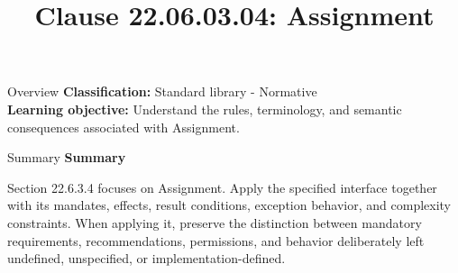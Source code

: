\documentclass[10pt,letterpaper]{article}
\title{Clause 22.06.03.04: Assignment}
\author{}
\date{}
\begin{document}
\maketitle
\begin{CornellOverviewBox}{Overview}
\textbf{Classification:} Standard library - Normative\\[2pt]
\textbf{Learning objective:} Understand the rules, terminology, and semantic consequences associated with Assignment.
\end{CornellOverviewBox}\begin{CornellSummaryBox}{Summary}
{\sffamily\bfseries\color{Accent} Summary}\par\vspace{3pt}Section 22.6.3.4 focuses on Assignment. Apply the specified interface together with its mandates, effects, result conditions, exception behavior, and complexity constraints. When applying it, preserve the distinction between mandatory requirements, recommendations, permissions, and behavior deliberately left undefined, unspecified, or implementation-defined.
\end{CornellSummaryBox}
\end{document}
